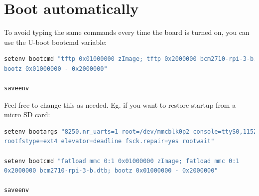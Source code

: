 \documentclass[11pt]{article}
\begin{document}
\section{Boot automatically}
To avoid typing the same commands every time the board is turned on, you can
 use the U-boot bootcmd variable:
\begin{lstlisting}[language=bash]
setenv bootcmd "tftp 0x01000000 zImage; tftp 0x2000000 bcm2710-rpi-3-b.dtb;
bootz 0x01000000 - 0x2000000"

saveenv
\end{lstlisting}
Feel free to change this as needed. Eg. if you want to restore startup from a
 micro SD card:
\begin{lstlisting}[language=bash]
setenv bootargs "8250.nr_uarts=1 root=/dev/mmcblk0p2 console=ttyS0,115200
rootfstype=ext4 elevator=deadline fsck.repair=yes rootwait"

setenv bootcmd "fatload mmc 0:1 0x01000000 zImage; fatload mmc 0:1
0x2000000 bcm2710-rpi-3-b.dtb; bootz 0x01000000 - 0x2000000"

saveenv
\end{lstlisting}
\end{document}
